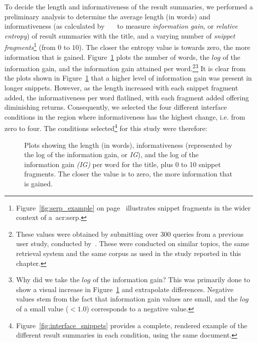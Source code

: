 To decide the length and informativeness of the result summaries, we performed a preliminary analysis to determine the average length (in words) and informativeness (as calculated by~~\citep{kullback1951information}~\citep{kullback1951information} to measure \emph{information gain}, or \emph{relative entropy}) of result summaries with the title, and a varying number of \emph{snippet fragments}\footnote{Figure~\ref{fig:serp_example} on page~\pageref{fig:serp_example} illustrates snippet fragments in the wider context of a~\gls{acr:serp}.} (from $0$ to $10$). The closer the entropy value is towards zero, the more information that is gained. Figure~\ref{fig:ig_plots} plots the number of words, the $log$ of the information gain, and the information gain attained per word.\footnote{These values were obtained by submitting over $300$ queries from a previous user study, conducted by~\cite{azzopardi2013query_cost}. These were conducted on similar topics, the same retrieval system and the same corpus as used in the study reported in this chapter.}\footnote{Why did we take the $log$ of the information gain? This was primarily done to show a visual increase in Figure~\ref{fig:ig_plots} and extrapolate differences. Negative values stem from the fact that information gain values are small, and the $log$ of a small value ($<1.0$) corresponds to a negative value.} It is clear from the plots shown in Figure~\ref{fig:ig_plots} that a higher level of information gain was present in longer snippets. However, as the length increased with each snippet fragment added, the informativeness per word flatlined, with each fragment added offering diminishing returns. Consequently, we selected the four different interface conditions in the region where informativeness has the highest change, i.e. from zero to four. The conditions selected\footnote{Figure~\ref{fig:interface_snippets} provides a complete, rendered example of the different result summaries in each condition, using the same document.} for this study were therefore:

\begin{figure}[t!]
    \centering
    \caption[Information gain plots]{Plots showing the length (in words), informativeness (represented by the log of the information gain, or \emph{IG}), and the log of the information gain \emph{(IG)} per word for the title, plus 0 to 10 snippet fragments. The closer the value is to zero, the more information that is gained.}
    \label{fig:ig_plots}
\end{figure}

